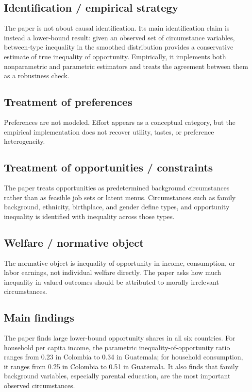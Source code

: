 \documentclass[11pt,a4paper]{article}
\begin{document}
\subsection*{Identification / empirical strategy}
The paper is not about causal identification. Its main identification claim is instead a lower-bound result: given an observed set of circumstance variables, between-type inequality in the smoothed distribution provides a conservative estimate of true inequality of opportunity. Empirically, it implements both nonparametric and parametric estimators and treats the agreement between them as a robustness check.

\subsection*{Treatment of preferences}
Preferences are not modeled. Effort appears as a conceptual category, but the empirical implementation does not recover utility, tastes, or preference heterogeneity.

\subsection*{Treatment of opportunities / constraints}
The paper treats opportunities as predetermined background circumstances rather than as feasible job sets or latent menus. Circumstances such as family background, ethnicity, birthplace, and gender define types, and opportunity inequality is identified with inequality across those types.

\subsection*{Welfare / normative object}
The normative object is inequality of opportunity in income, consumption, or labor earnings, not individual welfare directly. The paper asks how much inequality in valued outcomes should be attributed to morally irrelevant circumstances.

\subsection*{Main findings}
The paper finds large lower-bound opportunity shares in all six countries. For household per capita income, the parametric inequality-of-opportunity ratio ranges from 0.23 in Colombia to 0.34 in Guatemala; for household consumption, it ranges from 0.25 in Colombia to 0.51 in Guatemala. It also finds that family background variables, especially parental education, are the most important observed circumstances.
\end{document}
